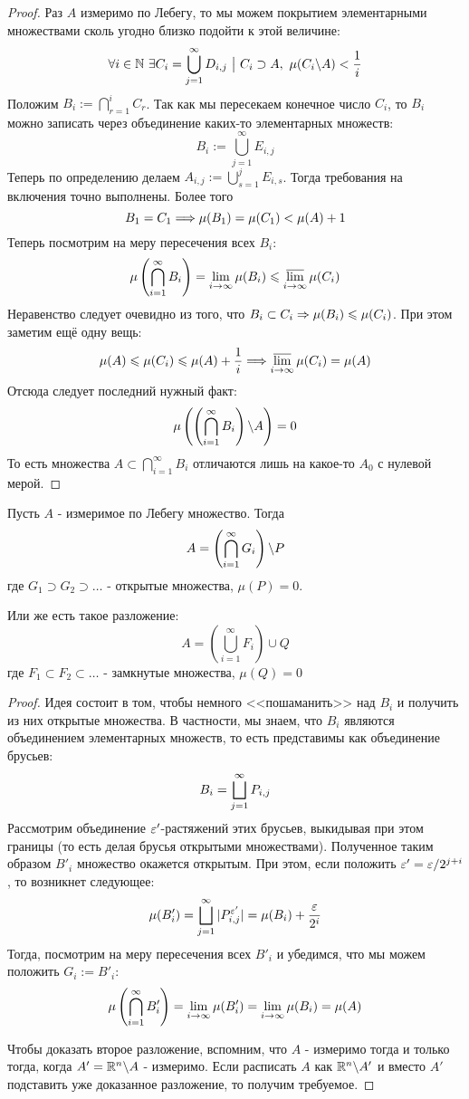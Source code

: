 \begin{proof}
	Раз $A$ измеримо по Лебегу, то мы можем покрытием элементарными множествами сколь угодно близко подойти к этой величине:
	\[
		\forall i \in \mathbb{N}\ \exists C_i = \bigcup_{j = 1}^\infty D_{i, j} \ \big|\  C_i \supset A,\ \mu(C_i \backslash A) < \frac{1}{i}
	\]
	Положим $B_i := \bigcap_{r = 1}^i C_r$. Так как мы пересекаем конечное число $C_i$, то $B_i$ можно записать через объединение каких-то элементарных множеств:
	\[
		B_i := \bigcup_{j = 1}^\infty E_{i, j}
	\]
	Теперь по определению делаем $A_{i, j} := \bigcup_{s = 1}^j E_{i, s}$. Тогда требования на включения точно выполнены. Более того
	\[
		B_1 = C_1 \Longrightarrow \mu(B_1) = \mu(C_1) < \mu(A) + 1
	\]
	Теперь посмотрим на меру пересечения всех $B_i$:
	\[
		\mu\left(\bigcap_{i = 1}^\infty B_i\right) = \lim\limits_{i \to \infty} \mu(B_i) \leqslant \varlimsup_{i \to \infty} \mu(C_i)
	\]
	Неравенство следует очевидно из того, что $B_i \subset C_i \Rightarrow \mu(B_i) \leqslant \mu(C_i)$. При этом заметим ещё одну вещь:
	\[
		\mu(A) \leqslant \mu(C_i) \leqslant \mu(A) + \frac{1}{i} \Longrightarrow \varlimsup_{i \to \infty} \mu(C_i) = \mu(A)
	\]
	Отсюда следует последний нужный факт:
	\[
		\mu\left(\left(\bigcap_{i = 1}^\infty B_i\right) \backslash A \right) = 0
	\]
	То есть множества $A \subset \bigcap_{i = 1}^\infty B_i$ отличаются лишь на какое-то $A_0$ с нулевой мерой.
\end{proof}

\begin{corollary}
	Пусть $A$ - измеримое по Лебегу множество. Тогда
	\[
		A = \left(\bigcap_{i = 1}^\infty G_i\right) \backslash P
	\]
	где $G_1 \supset G_2 \supset \ldots$ - открытые множества, $\mu(P) = 0$.
	
	Или же есть такое разложение:
	\[
		A = \left(\bigcup_{i = 1}^\infty F_i\right) \cup Q
	\]
	где $F_1 \subset F_2 \subset \ldots$ - замкнутые множества, $\mu(Q) = 0$
\end{corollary}

\begin{proof}
	Идея состоит в том, чтобы немного <<пошаманить>> над $B_i$ и получить из них открытые множества. В частности, мы знаем, что $B_i$ являются объединением элементарных множеств, то есть представимы как объединение брусьев:
	\[
		B_i = \bigsqcup_{j = 1}^\infty P_{i, j}
	\]
	Рассмотрим объединение $\varepsilon'$-растяжений этих брусьев, выкидывая при этом границы (то есть делая брусья открытыми множествами). Полученное таким образом $B'_i$ множество окажется открытым. При этом, если положить $\varepsilon' = \varepsilon / 2^{j + i}$, то возникнет следующее:
	\[
		\mu(B'_i) = \bigsqcup_{j = 1}^\infty |P^{\varepsilon'}_{i, j}| = \mu(B_i) + \frac{\varepsilon}{2^i}
	\]
	Тогда, посмотрим на меру пересечения всех $B'_i$ и убедимся, что мы можем положить $G_i := B'_i$:
	\[
		\mu\left(\bigcap_{i = 1}^\infty B'_i\right) = \lim\limits_{i \to \infty} \mu(B'_i) = \lim\limits_{i \to \infty} \mu(B_i) = \mu(A)
	\]
	
	Чтобы доказать второе разложение, вспомним, что $A$ - измеримо тогда и только тогда, когда $A' = \mathbb{R}^n \backslash A$ - измеримо. Если расписать $A$ как $\mathbb{R}^n \backslash A'$ и вместо $A'$ подставить уже доказанное разложение, то получим требуемое.
\end{proof}

